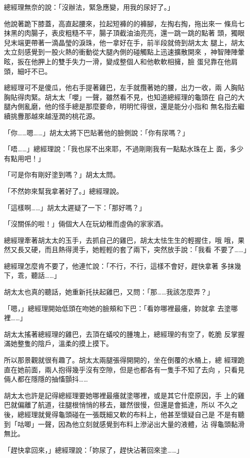 總經理無奈的說：「沒辦法，緊急應變，用我的尿好了。」

他說著跪下膝蓋，高直起腰來，拉起短褲的的褲腳，左掏右掏，拖出來一
條烏七抹黑的肉腸子，表皮粗糙不平，腸子頂截油油亮亮，還一跳一跳的點著
頭，獨眼兒末端更帶著一滴晶瑩的淚珠，他一拿好在手，前半段就倚到胡太太
腿上，胡太太立刻感覺到一股火熱的衝動從大腿內側的碰觸點上迅速擴散開來
，神智陣陣暈眩，扳在他胛上的雙手失力一滑，變成整個人和他軟軟相擁，臉
蛋兒靠在他肩頭，細吁不已。

總經理可不是傻瓜，他右手提著雞巴，左手就攬著她的腰，出力一收，兩
人胸貼胸貼得肉緊。胡太太「嚶」一聲，雖然看不見，也知道總經理的龜頭在
自己的大腿內側亂磨，他的怪手總是那麼要命，明明忙得很，還是能分小指和
無名指去繼續挑釁那越來越溼潤的桃花源。

「你……嗯……」胡太太將下巴貼著他的臉側說：「你有尿嗎？」

「唔……」總經理說：「我也尿不出來耶，不過剛剛我有一點點水珠在上
面，多少有點用吧！」

「可是你有剛好塗到嗎？」胡太太問。

「不然妳來幫我拿著好了。」總經理說。

「這樣啊……」胡太太遲疑了一下：「那好嗎？」

「沒關係的啦！」倆個大人在玩幼稚而虛偽的家家酒。

總經理牽著胡太太的玉手，去抓自己的雞巴，胡太太怯生生的輕握住，哦
哦，果然又長又硬，而且熱得燙手，她輕輕的套了兩下，突然放手說：「我看
不要了……」

總經理怎麼肯不要了，他連忙說：「不行，不行，這樣不會好，趕快拿著
多抹幾下，乖，聽話……」

胡太太也真的聽話，她重新托扶起雞巴，又問：「那……我該怎麼弄？」

「嗯，」總經理開始低頭在吻她的臉頰和下巴：「看妳哪裡最癢，妳就拿
去塗哪裡……」

胡太太搖著總經理的雞巴，去頂在蟻咬的腫塊上，總經理的有空了，乾脆
反掌握滿她整隻的陰戶，溫柔的摸上摸下。

所以那景觀就很有趣了。胡太太兩腿張得開開的，坐在倒覆的水桶上，總
經理跪直在她前面，兩人抱得幾乎沒有空隙，但是也都各有一隻手不知了去向
，只看見倆人都在隱隱的抽慉顫抖……

胡太太也許是記得總經理要她哪裡最癢就塗哪裡，或是其它什麼原因，手
上的雞巴就偏離了航道，往腿根悄悄的移去，雖然很慢，但還是會抵達，所以
不久之後，總經理就覺得龜頭碰在一張既細又軟的布料上，他甚至懷疑自己是
不是有聽到「咕唧」一聲，因為他立刻就感覺到布料上滲泌出大量的液體，沾
得龜頭黏滑無比。

「趕快拿回來，」總經理說：「妳尿了，趕快沾著回來塗……」

